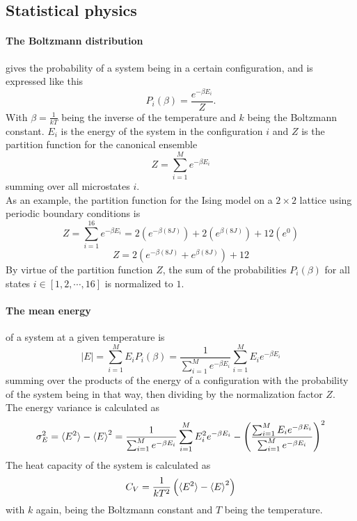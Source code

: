 \documentclass[10pt,a4paper]{article}
\begin{document}
\subsection{Statistical physics}
\paragraph{The Boltzmann distribution}gives the probability of a system being in a certain configuration, and is expressed like this
\begin{equation}
P_i(\beta) = \frac{e^{-\beta E_i}}{Z}.
\end{equation}
With $\beta = \frac{1}{kT}$ being the inverse of the temperature and $k$ being the Boltzmann constant. $E_i$ is the energy of the system in the configuration $i$ and $Z$ is the partition function for the canonical ensemble
\begin{equation}
Z = \sum_{i=1}^M e^{-\beta E_i}
\end{equation}
summing over all microstates $i$. \cite{Lecture_Notes_Fall_2015}\\As an example, the partition function for the Ising model on a $2\times2$ lattice using periodic boundary conditions is
\begin{equation}
Z = \sum_{i=1}^{16} e^{-\beta E_i} = 2\left( e^{-\beta (8J)} \right) +2\left( e^{\beta (8J)} \right) +12\left( e^{0} \right)
\end{equation}
\begin{equation}
Z =  2\left( e^{-\beta (8J)} +e^{\beta (8J)} \right)+12
\end{equation}
By virtue of the partition function $Z$, the sum of the probabilities $P_i(\beta)$ for all states $i \in [1,2,\cdots,16]$ is normalized to $1$. 
\paragraph{The mean energy} of a system at a given temperature is 
\begin{equation}\label{mean energy equation}
|E| = \sum_{i=1}^{M} E_iP_i(\beta) = \frac{1}{\sum_{i=1}^M e^{-\beta E_i}} \sum_{i=1}^M E_ie^{-\beta E_i}
\end{equation}
summing over the products of the energy of a configuration with the probability of the system being in that way, then dividing by the normalization factor $Z$.\\The energy variance is calculated as
\begin{equation}\label{C_V definition equation}
\sigma_E^2 = \braket{E^2}-\braket{E}^2 = \frac{1}{\sum_{i=1}^M e^{-\beta E_i}} \sum_{i=1}^M E_i^2e^{-\beta E_i} - \left( \frac{\sum_{i=1}^M E_ie^{-\beta E_i}}{\sum_{i=1}^M e^{-\beta E_i}} \right)^2
\end{equation}
The heat capacity of the system is calculated as 
\begin{equation}
C_V = \frac{1}{kT^2} \left(  \braket{E^2}-\braket{E}^2  \right)
\end{equation}
with $k$ again, being the Boltzmann constant and $T$ being the temperature.
\end{document}
